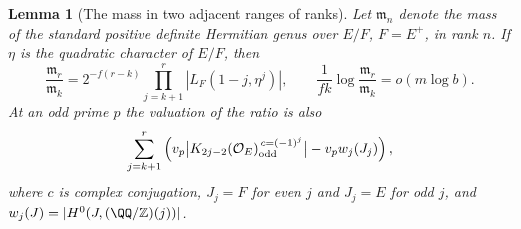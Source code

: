\documentclass[a4paper,11pt]{article}
\newtheorem{lemma}[proposition]{Lemma}
\theoremstyle{definition}
\theoremstyle{remark}
\newcommand{\ZZ}{\mathbb Z}\newcommand{\ord}{\operatorname{ord}}
\numberwithin{equation}{section}
\begin{document}
\begin{lemma}[The mass in two adjacent ranges of ranks]\label{lem:mass209}
Let \(\mathfrak m_n\) denote the mass of the standard positive
definite Hermitian genus over \(E/F\), \(F=E^+\), in rank \(n\).
If \(\eta\) is the quadratic character of \(E/F\), then
\begin{equation}
 \frac{\mathfrak m_r}{\mathfrak m_k}
    =2^{-f(r-k)}\prod_{j=k+1}^{r}|L_F(1-j,\eta^j)|,\qquad
 \frac{1}{fk}\log\frac{\mathfrak m_r}{\mathfrak m_k}
                           =o(m\log b).                   \label{eq:mass209}
\end{equation}
At an odd prime \(p\) the valuation of the ratio is also
\[
 \sum_{j=k+1}^r
 \left(v_p\big|K_{2j-2}(\mathcal O_E)_{\rm odd}^{\,c=(-1)^j}\big|
                   -v_p w_j(J_j)\right),
\]
where \(c\) is complex conjugation, \(J_j=F\) for even \(j\)
and \(J_j=E\) for odd \(j\), and
\(w_j(J)=|H^0(J,(\QQ/\ZZ)(j))|\).
\end{lemma}
\end{document}
